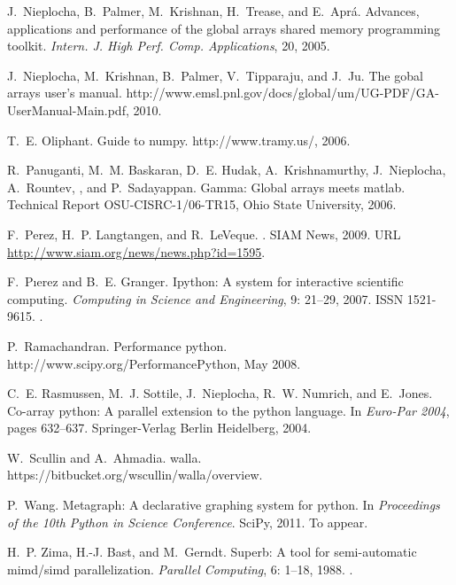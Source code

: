 \documentclass{sigplanconf}
\begin{document}
\begin{thebibliography}{35}
J.~Nieplocha, B.~Palmer, M.~Krishnan, H.~Trease, and E.~Apr\'{a}.
\newblock Advances, applications and performance of the global arrays shared
  memory programming toolkit.
\newblock \emph{Intern. J. High Perf. Comp. Applications}, 20,
  2005{}.

J.~Nieplocha, M.~Krishnan, B.~Palmer, V.~Tipparaju, and J.~Ju.
\newblock The gobal arrays user's manual.
\newblock http://www.emsl.pnl.gov/docs/global/um/UG-PDF/GA-UserManual-Main.pdf,
  2010.

T.~E. Oliphant.
\newblock Guide to numpy.
\newblock http://www.tramy.us/, 2006.

R.~Panuganti, M.~M. Baskaran, D.~E. Hudak, A.~Krishnamurthy, J.~Nieplocha,
  A.~Rountev, , and P.~Sadayappan.
\newblock Gamma: Global arrays meets matlab.
\newblock Technical Report OSU-CISRC-1/06-TR15, Ohio State University, 2006.

F.~Perez, H.~P. Langtangen, and R.~LeVeque.
.
\newblock SIAM News, 2009.
\newblock URL \url{http://www.siam.org/news/news.php?id=1595}.

F.~P\i{e}rez and B.~E. Granger.
\newblock Ipython: A system for interactive scientific computing.
\newblock \emph{Computing in Science and Engineering}, 9: 21--29,
  2007.
\newblock ISSN 1521-9615.
\newblock {}.

P.~Ramachandran.
\newblock Performance python.
\newblock http://www.scipy.org/PerformancePython, May 2008.

C.~E. Rasmussen, M.~J. Sottile, J.~Nieplocha, R.~W. Numrich, and E.~Jones.
\newblock Co-array python: A parallel extension to the python language.
\newblock In \emph{Euro-Par 2004}, pages 632--637. Springer-Verlag Berlin
  Heidelberg, 2004.

W.~Scullin and A.~Ahmadia.
\newblock walla.
\newblock https://bitbucket.org/wscullin/walla/overview.

P.~Wang.
\newblock Metagraph: A declarative graphing system for python.
\newblock In \emph{Proceedings of the 10th Python in Science Conference}.
  SciPy, 2011.
\newblock To appear.

H.~P. Zima, H.-J. Bast, and M.~Gerndt.
\newblock Superb: A tool for semi-automatic mimd/simd parallelization.
\newblock \emph{Parallel Computing}, 6: 1--18, 1988.
\newblock {}.

\end{thebibliography}
\end{document}
